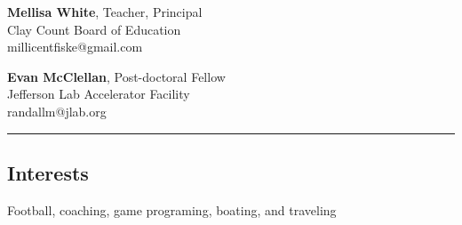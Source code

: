 \documentclass[12pt,letterpaper]{article}
\begin{document}
\begin{multicols}{2}
	{\bf{Mellisa White}}, Teacher, Principal\\
	Clay Count Board of Education\\
	millicentfiske@gmail.com\\
	\columnbreak
	
	{\bf{Evan McClellan}}, Post-doctoral Fellow\\
	Jefferson Lab Accelerator Facility\\
	randallm@jlab.org\\
\end{multicols}

\hrule

\subsection*{Interests}

Football, coaching, game programing, boating, and traveling
\end{document}
